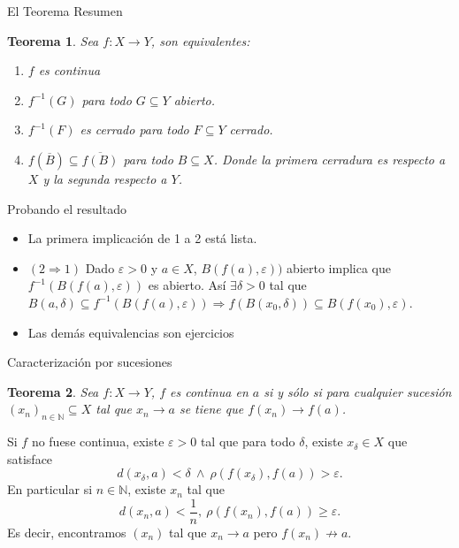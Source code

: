 \documentclass[utf8]{beamer}
\theoremstyle{plain}
\newtheorem{Th}{Teorema}               %
\theoremstyle{definition}
\theoremstyle{remark}
\numberwithin{equation}{section}
\newcommand{\dl}{\delta}                %
\newcommand{\eps}{\varepsilon}          %
\newcommand{\bN}{\mathbb{N}}    %
\renewcommand{\geq}{\geqslant}          %
\begin{document}
\begin{frame}{El Teorema Resumen}
    \begin{Th}\label{thm:teoremaResumenContinuidad}
        Sea $f\colon X\to Y$, son equivalentes:
        \begin{enumerate}
          \item $f$ es continua
          \item $f^{-1}(G)$ para todo $G\subseteq Y$ abierto.
          \item $f^{-1}(F)$ es cerrado para todo $F\subseteq Y$ cerrado.
          \item $f(\overline{B})\subseteq \overline{f(B)}$ para todo $B\subseteq X$. Donde la primera cerradura es respecto a $X$ y la segunda respecto a $Y$.
        \end{enumerate}
      \end{Th}
\end{frame}

\begin{frame}{Probando el resultado}
    \begin{itemize}
        \item La primera implicaci\'on de 1 a 2 est\'a lista. \pause
        \item $(\mathit{2}\Rightarrow\mathit{1})$ Dado $\varepsilon>0$ y $a\in X$, $B(f(a),\varepsilon))$ abierto implica que $f^{-1}(B(f(a),\varepsilon))$ es abierto. Así $\exists\delta>0$ tal que $B(a,\delta)\subseteq f^{-1}( B(f(a),\varepsilon))\Rightarrow f(B(x_0,\delta))\subseteq B(f(x_0),\varepsilon)$.\pause
        \item \alert{Las dem\'as equivalencias son ejercicios}
    \end{itemize}
\end{frame}

\begin{frame}{Caracterización por sucesiones}
    \begin{Th}\label{thm:equivSuccCont}
        Sea $f\colon X\to Y$, $f$ es continua en $a$ si y sólo si para cualquier sucesión $(x_n)_{n\in\bN}\subseteq X$ tal que $x_n\to a$ se tiene que $f(x_n)\to f(a)$.
      \end{Th}
      Si $f$ no fuese continua, existe $\eps>0$ tal que para todo $\dl$, existe $x_\dl\in X$ que satisface
      $$d(x_\dl,a)<\dl\ \land\ \rho(f(x_\dl),f(a))>\eps.$$
      En particular si $n\in\bN$, existe $x_n$ tal que 
      $$d(x_n,a)<\frac{1}{n},\ \rho(f(x_n),f(a))\geq \eps.$$
      Es decir, encontramos $(x_n)$ tal que $x_n\to a$ pero $f(x_n)\not\to a$.
\end{frame}
\end{document}
